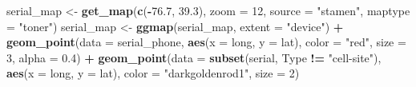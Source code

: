 \documentclass[]{book}
\makeatletter
\newenvironment{Shaded}{\begin{snugshade}}{\end{snugshade}}
\newcommand{\KeywordTok}[1]{\textcolor[rgb]{0.13,0.29,0.53}{\textbf{#1}}}
\newcommand{\DataTypeTok}[1]{\textcolor[rgb]{0.13,0.29,0.53}{#1}}
\newcommand{\DecValTok}[1]{\textcolor[rgb]{0.00,0.00,0.81}{#1}}
\newcommand{\FloatTok}[1]{\textcolor[rgb]{0.00,0.00,0.81}{#1}}
\newcommand{\StringTok}[1]{\textcolor[rgb]{0.31,0.60,0.02}{#1}}
\newcommand{\OperatorTok}[1]{\textcolor[rgb]{0.81,0.36,0.00}{\textbf{#1}}}
\newcommand{\NormalTok}[1]{#1}
\newenvironment{kframe}{%
\medskip{}
\setlength{\fboxsep}{.8em}
 \def\at@end@of@kframe{}%
 \ifinner\ifhmode%
  \def\at@end@of@kframe{\end{minipage}}%
  \begin{minipage}{\columnwidth}%
 \fi\fi%
 \def\FrameCommand##1{\hskip\@totalleftmargin \hskip-\fboxsep
 \colorbox{shadecolor}{##1}\hskip-\fboxsep
     \hskip-\linewidth \hskip-\@totalleftmargin \hskip\columnwidth}%
 \MakeFramed {\advance\hsize-\width
   \@totalleftmargin\z@ \linewidth\hsize
   \@setminipage}}%
 {\par\unskip\endMakeFramed%
 \at@end@of@kframe}
\renewenvironment{Shaded}{\begin{kframe}}{\end{kframe}}
\theoremstyle{definition}
\theoremstyle{definition}
\theoremstyle{definition}
\theoremstyle{remark}
\makeatother
\begin{document}
\begin{Shaded}
\end{Shaded}

\begin{Shaded}
\begin{Highlighting}[]
\NormalTok{serial_map <-}\StringTok{ }\KeywordTok{get_map}\NormalTok{(}\KeywordTok{c}\NormalTok{(}\OperatorTok{-}\FloatTok{76.7}\NormalTok{, }\FloatTok{39.3}\NormalTok{), }\DataTypeTok{zoom =} \DecValTok{12}\NormalTok{,}
                      \DataTypeTok{source =} \StringTok{"stamen"}\NormalTok{,}
                      \DataTypeTok{maptype =} \StringTok{"toner"}\NormalTok{)}
\NormalTok{serial_map <-}\StringTok{ }\KeywordTok{ggmap}\NormalTok{(serial_map, }\DataTypeTok{extent =} \StringTok{"device"}\NormalTok{) }\OperatorTok{+}\StringTok{ }
\StringTok{        }\KeywordTok{geom_point}\NormalTok{(}\DataTypeTok{data =}\NormalTok{ serial_phone,}
                   \KeywordTok{aes}\NormalTok{(}\DataTypeTok{x =}\NormalTok{ long, }\DataTypeTok{y =}\NormalTok{ lat),}
                   \DataTypeTok{color =} \StringTok{"red"}\NormalTok{, }\DataTypeTok{size =} \DecValTok{3}\NormalTok{,}
                   \DataTypeTok{alpha =} \FloatTok{0.4}\NormalTok{) }\OperatorTok{+}
\StringTok{        }\KeywordTok{geom_point}\NormalTok{(}\DataTypeTok{data =} \KeywordTok{subset}\NormalTok{(serial,}
\NormalTok{                                 Type }\OperatorTok{!=}\StringTok{ "cell-site"}\NormalTok{),}
                   \KeywordTok{aes}\NormalTok{(}\DataTypeTok{x =}\NormalTok{ long, }\DataTypeTok{y =}\NormalTok{ lat),}
                   \DataTypeTok{color =} \StringTok{"darkgoldenrod1"}\NormalTok{,}
                   \DataTypeTok{size =} \DecValTok{2}\NormalTok{)}
\end{Highlighting}
\end{Shaded}
\end{document}
